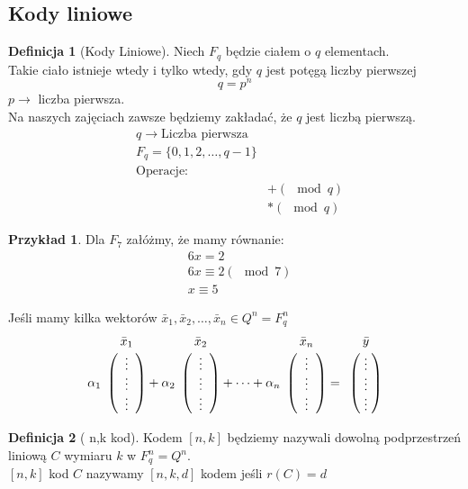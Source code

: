 \documentclass[a4paper,12pt]{article}
\theoremstyle{definition}%
\newtheorem{example}{Przykład}
\newtheorem*{example*}{Przykład} %
\theoremstyle{definition}
\newtheorem{definition}{Definicja}%
\theoremstyle{problem}
\let\bbordermatrix\bordermatrix
\begin{document}
\subsection{Kody liniowe}
\begin{definition}[Kody Liniowe]
Niech $F_q$ będzie ciałem o $q$ elementach.\\ Takie ciało istnieje wtedy i tylko wtedy, gdy $q$ jest potęgą liczby pierwszej $$q=p^n$$ $p\rightarrow$ liczba pierwsza.\\ Na naszych zajęciach zawsze będziemy zakładać, że $q$ jest liczbą pierwszą.
\begin{align*}
&q\rightarrow\text{Liczba pierwsza}\\
&F_q=\{0,1,2,\dots ,q-1\}\\
&\text{Operacje: }\\
&&+ (\mod q)\\
&&* (\mod q)
\end{align*}
\end{definition}
\begin{example*}
Dla $F_7$ załóżmy, że mamy równanie:
\begin{align*}
&6x=2\\
&6x\equiv  2 (\mod 7)\\
&x \equiv 5
\end{align*}
\end{example*}

Jeśli mamy kilka wektorów $\bar{x}_1,\bar{x}_2,\dots ,\bar{x}_n\in Q^n=F_q^n$
$$\alpha _1 \bbordermatrix{&\bar{x}_1\cr
&\vdots\cr &\vdots\cr &\vdots}+\alpha _2 \bbordermatrix{&\bar{x}_2\cr
&\vdots\cr &\vdots\cr &\vdots}+\dots +\alpha _n \bbordermatrix{&\bar{x}_n\cr
&\vdots\cr &\vdots\cr &\vdots}=\bbordermatrix{&\bar{y}\cr
&\vdots\cr &\vdots\cr &\vdots}$$

\begin{definition}[ n,k kod]
Kodem $[n,k]$ będziemy nazywali dowolną podprzestrzeń liniową $C$ wymiaru $k$ w $F_q^n=Q^n$.\\$[n,k]$ kod $C$ nazywamy $[n,k,d]$ kodem jeśli $r(C)=d$
\end{definition}
\end{document}
